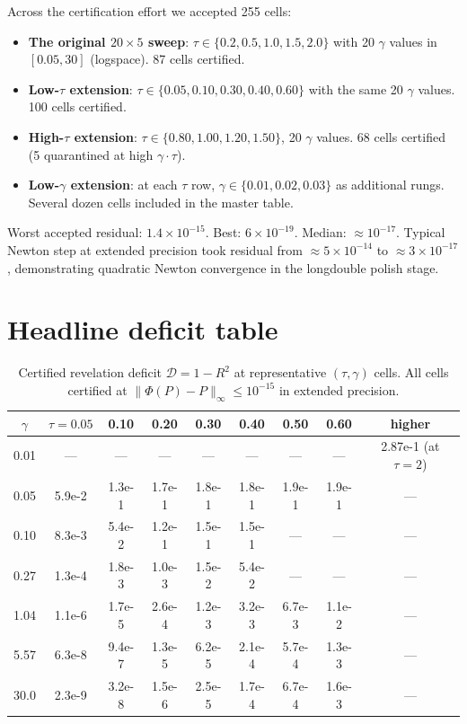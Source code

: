\documentclass[11pt]{article}
\newcommand{\1}{\mathbf{1}}
\newcommand{\deficit}{\mathcal{D}}
\begin{document}
Across the certification effort we accepted 255 cells:
\begin{itemize}
\item \textbf{The original $20\times 5$ sweep}: $\tau \in \{0.2,0.5,1.0,1.5,2.0\}$
with 20 $\gamma$ values in $[0.05, 30]$ (logspace).  87 cells certified.
\item \textbf{Low-$\tau$ extension}: $\tau \in \{0.05, 0.10, 0.30, 0.40, 0.60\}$
with the same 20 $\gamma$ values.  100 cells certified.
\item \textbf{High-$\tau$ extension}: $\tau \in \{0.80, 1.00, 1.20, 1.50\}$,
20 $\gamma$ values.  68 cells certified (5 quarantined at high $\gamma\cdot\tau$).
\item \textbf{Low-$\gamma$ extension}: at each $\tau$ row,
$\gamma \in \{0.01, 0.02, 0.03\}$ as additional rungs.  Several dozen
cells included in the master table.
\end{itemize}

Worst accepted residual: $1.4 \times 10^{-15}$.  Best: $6 \times 10^{-19}$.
Median: $\approx 10^{-17}$.  Typical Newton step at extended precision
took residual from $\approx 5 \times 10^{-14}$ to $\approx 3 \times
10^{-17}$, demonstrating quadratic Newton convergence in the
longdouble polish stage.

\section{Headline deficit table}

\begin{table}[H]\centering\small
\begin{tabular}{c|cccccccc}
\toprule
$\gamma$ & $\tau{=}0.05$ & 0.10 & 0.20 & 0.30 & 0.40 & 0.50 & 0.60 & higher \\
\midrule
0.01 & --- & --- & --- & --- & --- & --- & --- & 2.87e-1 (at $\tau{=}2$) \\
0.05 & 5.9e-2 & 1.3e-1 & 1.7e-1 & 1.8e-1 & 1.8e-1 & 1.9e-1 & 1.9e-1 & --- \\
0.10 & 8.3e-3 & 5.4e-2 & 1.2e-1 & 1.5e-1 & 1.5e-1 & --- & --- & --- \\
0.27 & 1.3e-4 & 1.8e-3 & 1.0e-3 & 1.5e-2 & 5.4e-2 & --- & --- & --- \\
1.04 & 1.1e-6 & 1.7e-5 & 2.6e-4 & 1.2e-3 & 3.2e-3 & 6.7e-3 & 1.1e-2 & --- \\
5.57 & 6.3e-8 & 9.4e-7 & 1.3e-5 & 6.2e-5 & 2.1e-4 & 5.7e-4 & 1.3e-3 & --- \\
30.0 & 2.3e-9 & 3.2e-8 & 1.5e-6 & 2.5e-5 & 1.7e-4 & 6.7e-4 & 1.6e-3 & --- \\
\bottomrule
\end{tabular}
\caption{Certified revelation deficit $\deficit = 1 - R^2$ at
representative $(\tau, \gamma)$ cells.  All cells certified at
$\|\Phi(P)-P\|_\infty \le 10^{-15}$ in extended precision.}
\label{tab:headline}
\end{table}
\end{document}

